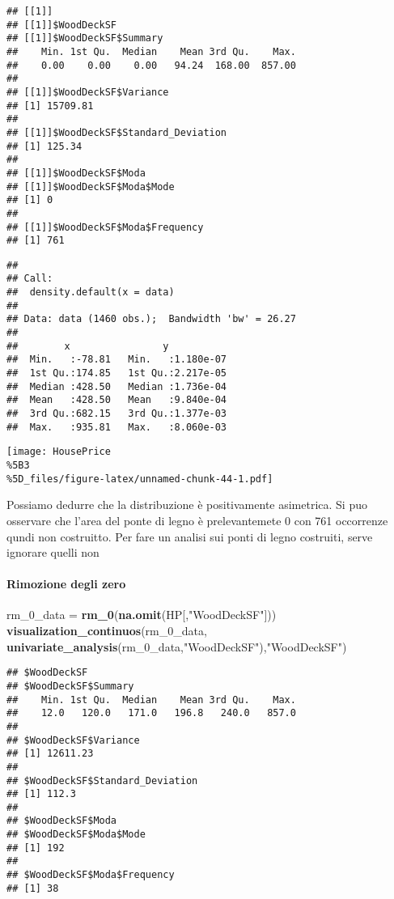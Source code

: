 \documentclass[
]{article}
\newenvironment{Shaded}{\begin{snugshade}}{\end{snugshade}}
\newcommand{\FunctionTok}[1]{\textcolor[rgb]{0.13,0.29,0.53}{\textbf{#1}}}
\newcommand{\NormalTok}[1]{#1}
\newcommand{\OtherTok}[1]{\textcolor[rgb]{0.56,0.35,0.01}{#1}}
\newcommand{\StringTok}[1]{\textcolor[rgb]{0.31,0.60,0.02}{#1}}
\begin{document}
\begin{verbatim}
## [[1]]
## [[1]]$WoodDeckSF
## [[1]]$WoodDeckSF$Summary
##    Min. 1st Qu.  Median    Mean 3rd Qu.    Max. 
##    0.00    0.00    0.00   94.24  168.00  857.00 
## 
## [[1]]$WoodDeckSF$Variance
## [1] 15709.81
## 
## [[1]]$WoodDeckSF$Standard_Deviation
## [1] 125.34
## 
## [[1]]$WoodDeckSF$Moda
## [[1]]$WoodDeckSF$Moda$Mode
## [1] 0
## 
## [[1]]$WoodDeckSF$Moda$Frequency
## [1] 761
\end{verbatim}

\begin{verbatim}
## 
## Call:
##  density.default(x = data)
## 
## Data: data (1460 obs.);  Bandwidth 'bw' = 26.27
## 
##        x                y            
##  Min.   :-78.81   Min.   :1.180e-07  
##  1st Qu.:174.85   1st Qu.:2.217e-05  
##  Median :428.50   Median :1.736e-04  
##  Mean   :428.50   Mean   :9.840e-04  
##  3rd Qu.:682.15   3rd Qu.:1.377e-03  
##  Max.   :935.81   Max.   :8.060e-03
\end{verbatim}

\texttt{[image: HousePrice\\\%5B3\\\%5D\_files/figure-latex/unnamed-chunk-44-1.pdf]}

Possiamo dedurre che la distribuzione è positivamente asimetrica. Si puo
osservare che l'area del ponte di legno è prelevantemete 0 con 761
occorrenze qundi non costruitto. Per fare un analisi sui ponti di legno
costruiti, serve ignorare quelli non

\paragraph{Rimozione degli zero}\label{rimozione-degli-zero-8}

\begin{Shaded}
\begin{Highlighting}[]
\NormalTok{rm\_0\_data }\OtherTok{=} \FunctionTok{rm\_0}\NormalTok{(}\FunctionTok{na.omit}\NormalTok{(HP[,}\StringTok{"WoodDeckSF"}\NormalTok{]))}
\FunctionTok{visualization\_continuos}\NormalTok{(rm\_0\_data, }\FunctionTok{univariate\_analysis}\NormalTok{(rm\_0\_data,}\StringTok{"WoodDeckSF"}\NormalTok{),}\StringTok{"WoodDeckSF"}\NormalTok{)}
\end{Highlighting}
\end{Shaded}

\begin{verbatim}
## $WoodDeckSF
## $WoodDeckSF$Summary
##    Min. 1st Qu.  Median    Mean 3rd Qu.    Max. 
##    12.0   120.0   171.0   196.8   240.0   857.0 
## 
## $WoodDeckSF$Variance
## [1] 12611.23
## 
## $WoodDeckSF$Standard_Deviation
## [1] 112.3
## 
## $WoodDeckSF$Moda
## $WoodDeckSF$Moda$Mode
## [1] 192
## 
## $WoodDeckSF$Moda$Frequency
## [1] 38
\end{verbatim}
\end{document}
